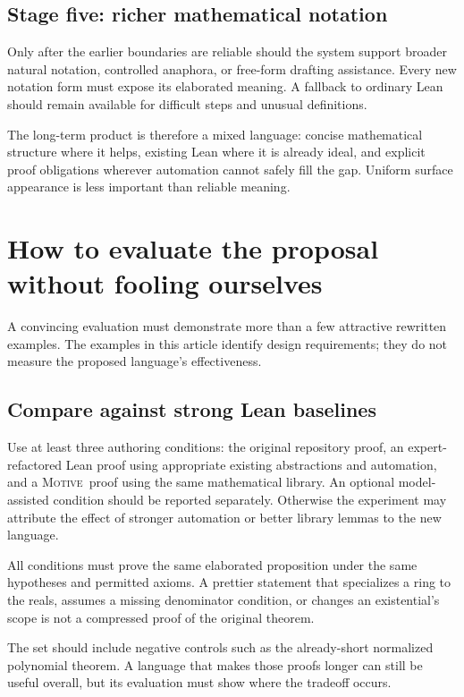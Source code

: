 \documentclass[11pt,a4paper]{article}
\newcommand{\Motive}{\textnormal{\textsc{Motive}}}
\theoremstyle{remark}
\begin{document}
\subsection{Stage five: richer mathematical notation}
Only after the earlier boundaries are reliable should the system support broader natural notation, controlled anaphora, or free-form drafting assistance. Every new notation form must expose its elaborated meaning. A fallback to ordinary Lean should remain available for difficult steps and unusual definitions.

The long-term product is therefore a mixed language: concise mathematical structure where it helps, existing Lean where it is already ideal, and explicit proof obligations wherever automation cannot safely fill the gap. Uniform surface appearance is less important than reliable meaning.

\section{How to evaluate the proposal without fooling ourselves}
\label{sec:evaluation}
A convincing evaluation must demonstrate more than a few attractive rewritten examples. The examples in this article identify design requirements; they do not measure the proposed language's effectiveness.

\subsection{Compare against strong Lean baselines}
Use at least three authoring conditions: the original repository proof, an expert-refactored Lean proof using appropriate existing abstractions and automation, and a \Motive\ proof using the same mathematical library. An optional model-assisted condition should be reported separately. Otherwise the experiment may attribute the effect of stronger automation or better library lemmas to the new language.

All conditions must prove the same elaborated proposition under the same hypotheses and permitted axioms. A prettier statement that specializes a ring to the reals, assumes a missing denominator condition, or changes an existential's scope is not a compressed proof of the original theorem.

The set should include negative controls such as the already-short normalized polynomial theorem. A language that makes those proofs longer can still be useful overall, but its evaluation must show where the tradeoff occurs.
\end{document}
